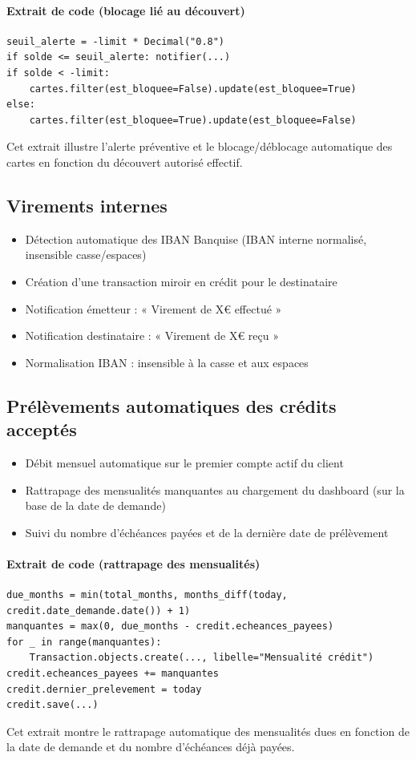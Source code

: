 \documentclass[12pt,a4paper]{report}
\begin{document}
\paragraph{Extrait de code (blocage lié au découvert)} 
\begin{verbatim}
seuil_alerte = -limit * Decimal("0.8")
if solde <= seuil_alerte: notifier(...)
if solde < -limit:
    cartes.filter(est_bloquee=False).update(est_bloquee=True)
else:
    cartes.filter(est_bloquee=True).update(est_bloquee=False)
\end{verbatim}
Cet extrait illustre l'alerte préventive et le blocage/déblocage automatique des cartes en fonction du découvert autorisé effectif.

\subsection{Virements internes}
\begin{itemize}[leftmargin=1.5cm]
    \item Détection automatique des IBAN Banquise (IBAN interne normalisé, insensible casse/espaces)
    \item Création d'une transaction miroir en crédit pour le destinataire
    \item Notification émetteur : « Virement de X€ effectué »
    \item Notification destinataire : « Virement de X€ reçu »
    \item Normalisation IBAN : insensible à la casse et aux espaces
\end{itemize}

\subsection{Prélèvements automatiques des crédits acceptés}
\begin{itemize}[leftmargin=1.5cm]
    \item Débit mensuel automatique sur le premier compte actif du client
    \item Rattrapage des mensualités manquantes au chargement du dashboard (sur la base de la date de demande)
    \item Suivi du nombre d'échéances payées et de la dernière date de prélèvement
\end{itemize}

\paragraph{Extrait de code (rattrapage des mensualités)} 
\begin{verbatim}
due_months = min(total_months, months_diff(today, credit.date_demande.date()) + 1)
manquantes = max(0, due_months - credit.echeances_payees)
for _ in range(manquantes):
    Transaction.objects.create(..., libelle="Mensualité crédit")
credit.echeances_payees += manquantes
credit.dernier_prelevement = today
credit.save(...)
\end{verbatim}
Cet extrait montre le rattrapage automatique des mensualités dues en fonction de la date de demande et du nombre d'échéances déjà payées.
\end{document}
